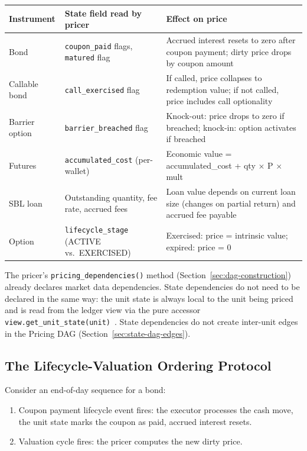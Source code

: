 \documentclass[11pt,a4paper]{article}
\begin{document}
\begin{center}
\small
\begin{tabular}{l p{4cm} p{5.5cm}}
\toprule
\textbf{Instrument} & \textbf{State field read by pricer} & \textbf{Effect on price} \\
\midrule
Bond & \texttt{coupon\_paid} flags, \texttt{matured} flag & Accrued interest resets to zero after coupon payment; dirty price drops by coupon amount \\
Callable bond & \texttt{call\_exercised} flag & If called, price collapses to redemption value; if not called, price includes call optionality \\
Barrier option & \texttt{barrier\_breached} flag & Knock-out: price drops to zero if breached; knock-in: option activates if breached \\
Futures & \texttt{accumulated\_cost} (per-wallet) & Economic value = accumulated\_cost + qty $\times$ P $\times$ mult \\
SBL loan & Outstanding quantity, fee rate, accrued fees & Loan value depends on current loan size (changes on partial return) and accrued fee payable \\
Option & \texttt{lifecycle\_stage} (ACTIVE vs.\ EXERCISED) & Exercised: price = intrinsic value; expired: price = 0 \\
\bottomrule
\end{tabular}
\end{center}

\noindent The pricer's \texttt{pricing\_dependencies()} method (Section~\ref{sec:dag-construction}) already declares market data dependencies.  State dependencies do not need to be declared in the same way: the unit state is always local to the unit being priced and is read from the ledger view via the pure accessor \texttt{view.get\_unit\_state(unit)}~\cite[\S7.3]{ledger}.  State dependencies do not create inter-unit edges in the Pricing DAG (Section~\ref{sec:state-dag-edges}).

\subsection{The Lifecycle-Valuation Ordering Protocol}
\label{sec:ordering-protocol}

Consider an end-of-day sequence for a bond:
\begin{enumerate}[nosep]
\item Coupon payment lifecycle event fires: the executor processes the cash move, the unit state marks the coupon as paid, accrued interest resets.
\item Valuation cycle fires: the pricer computes the new dirty price.
\end{enumerate}
\end{document}
